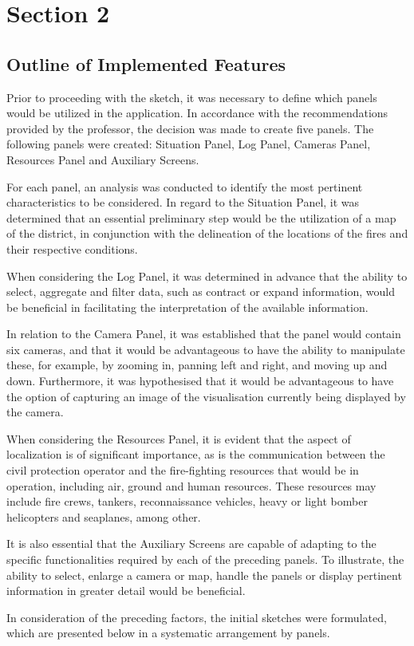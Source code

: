 \chapter{Section 2} \label{section2}
\section{Outline of Implemented Features}
Prior to proceeding with the sketch, it was necessary to define which panels would be utilized in the application. In accordance with the recommendations provided by the professor, the decision was made to create five panels. The following panels were created: Situation Panel, Log Panel, Cameras Panel, Resources Panel and Auxiliary Screens. \par
For each panel, an analysis was conducted to identify the most pertinent characteristics to be considered. In regard to the Situation Panel, it was determined that an essential preliminary step would be the utilization of a map of the district, in conjunction with the delineation of the locations of the fires and their respective conditions. \par
When considering the Log Panel, it was determined in advance that the ability to select, aggregate and filter data, such as contract or expand information, would be beneficial in facilitating the interpretation of the available information. \par
In relation to the Camera Panel, it was established that the panel would contain six cameras, and that it would be advantageous to have the ability to manipulate these, for example, by zooming in, panning left and right, and moving up and down. Furthermore, it was hypothesised that it would be advantageous to have the option of capturing an image of the visualisation currently being displayed by the camera. \par
When considering the Resources Panel, it is evident that the aspect of localization is of significant importance, as is the communication between the civil protection operator and the fire-fighting resources that would be in operation, including air, ground and human resources. These resources may include fire crews, tankers, reconnaissance vehicles, heavy or light bomber helicopters and seaplanes, among other. \par
It is also essential that the Auxiliary Screens are capable of adapting to the specific functionalities required by each of the preceding panels. To illustrate, the ability to select, enlarge a camera or map, handle the panels or display pertinent information in greater detail would be beneficial. \par
In consideration of the preceding factors, the initial sketches were formulated, which are presented below in a systematic arrangement by panels. \par
